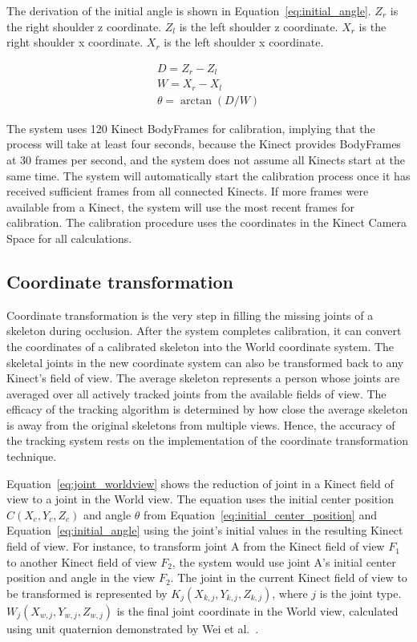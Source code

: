 The derivation of the initial angle is shown in Equation~\ref{eq:initial_angle}. $Z_r$ is the right shoulder z coordinate. $Z_l$ is the left shoulder z coordinate. $X_r$ is the right shoulder x coordinate. $X_r$ is the left shoulder x coordinate.

\begin{equation}
\label{eq:initial_angle}
\begin{gathered}
D = Z_r - Z_l \\
W = X_r - X_l \\
\theta = \arctan(D/W)
\end{gathered}
\end{equation}

The system uses 120 Kinect BodyFrames for calibration, implying that the process will take at least four seconds, because the Kinect provides BodyFrames at 30 frames per second, and the system does not assume all Kinects start at the same time. The system will automatically start the calibration process once it has received sufficient frames from all connected Kinects. If more frames were available from a Kinect, the system will use the most recent frames for calibration. The calibration procedure uses the coordinates in the Kinect Camera Space for all calculations.

\subsection{Coordinate transformation}

Coordinate transformation is the very step in filling the missing joints of a skeleton during occlusion. After the system completes calibration, it can convert the coordinates of a calibrated skeleton into the World coordinate system. The skeletal joints in the new coordinate system can also be transformed back to any Kinect's field of view. The average skeleton represents a person whose joints are averaged over all actively tracked joints from the available fields of view. The efficacy of the tracking algorithm is determined by how close the average skeleton is away from the original skeletons from multiple views. Hence, the accuracy of the tracking system rests on the implementation of the coordinate transformation technique.

Equation~\ref{eq:joint_worldview} shows the reduction of joint in a Kinect field of view to a joint in the World view. The equation uses the initial center position $C(X_c, Y_c, Z_c)$ and angle $\theta$ from Equation~\ref{eq:initial_center_position} and Equation~\ref{eq:initial_angle} using the joint's initial values in the resulting Kinect field of view. For instance, to transform joint A from the Kinect field of view $F_1$ to another Kinect field of view $F_2$, the system would use joint A's initial center position and angle in the view $F_2$. The joint in the current Kinect field of view to be transformed is represented by $K_j(X_{k,j}, Y_{k,j}, Z_{k,j})$, where $j$ is the joint type. $W_j(X_{w,j}, Y_{w,j}, Z_{w,j})$ is the final joint coordinate in the World view, calculated using unit quaternion demonstrated by Wei et al.~\cite{wei_kinect_calibration}. 

